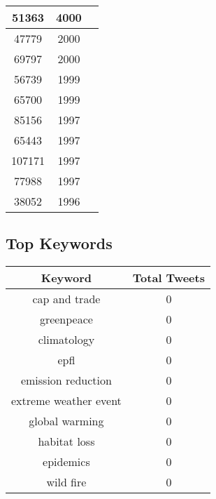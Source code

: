 \documentclass{article}\usepackage[T1]{fontenc}
\begin{document}
\begin{tabular}{|c|c|c|}
 \hline
51363 & 4000\\ 
 \hline
47779 & 2000\\ 
 \hline
69797 & 2000\\ 
 \hline
56739 & 1999\\ 
 \hline
65700 & 1999\\ 
 \hline
85156 & 1997\\ 
 \hline
65443 & 1997\\ 
 \hline
107171 & 1997\\ 
 \hline
77988 & 1997\\ 
 \hline
38052 & 1996\\ 
 \hline
\end{tabular}\subsection*{Top Keywords}\begin{tabular}{|c|c|}         \hline         Keyword & Total Tweets \\ 
 \hline
cap and trade & 0\\ 
 \hline
greenpeace & 0\\ 
 \hline
climatology & 0\\ 
 \hline
epfl & 0\\ 
 \hline
emission reduction & 0\\ 
 \hline
extreme weather event & 0\\ 
 \hline
global warming & 0\\ 
 \hline
habitat loss & 0\\ 
 \hline
epidemics & 0\\ 
 \hline
wild fire & 0\\ 
 \hline
\end{tabular}
\end{document}
